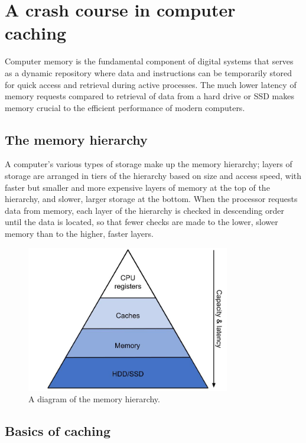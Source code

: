 \documentclass[12pt,twoside]{reedthesis}
\begin{document}
\section{A crash course in computer caching}

Computer memory is the fundamental component of digital systems that serves as a dynamic repository where data and instructions can be temporarily stored for quick access and retrieval during active processes. The much lower latency of memory requests compared to retrieval of data from a hard drive or SSD makes memory crucial to the efficient performance of modern computers.

	\subsection*{The memory hierarchy}

	A computer's various types of storage make up the memory hierarchy; layers of storage are arranged in tiers of the hierarchy based on size and access speed, with faster but smaller and more expensive layers of memory at the top of the hierarchy, and slower, larger storage at the bottom. When the processor requests data from memory, each layer of the hierarchy is checked in descending order until the data is located, so that fewer checks are made to the lower, slower memory than to the higher, faster layers.

	\begin{figure}[h]
    	\centering
    	\includegraphics[width=3.5in]{figures/mem_hierarchy.jpg}
    	\caption{A diagram of the memory hierarchy.}
	\end{figure}

	\subsection*{Basics of caching}
	
\end{document}
